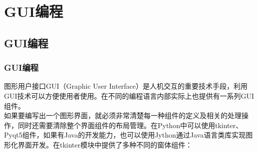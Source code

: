 \chapter{GUI编程}

\section{GUI编程}

\subsection{GUI编程}

图形用户接口GUI（Graphic User Interface）是人机交互的重要技术手段，利用GUI技术可以方便使用者使用。在不同的编程语言内部实际上也提供有一系列GUI组件。\\

如果要编写出一个图形界面，就必须非常清楚每一种组件的定义及相关的处理操作，同时还需要清除整个界面组件的布局管理。在Python中可以使用tkinter、Pyqt5组件，如果有Java的开发能力，也可以使用Jython通过Java语言类库实现图形化界面开发。在tkinter模块中提供了多种不同的窗体组件：

\begin{table}[H]
	\centering
	\caption{tkinter模块窗体组件}
\end{table}

